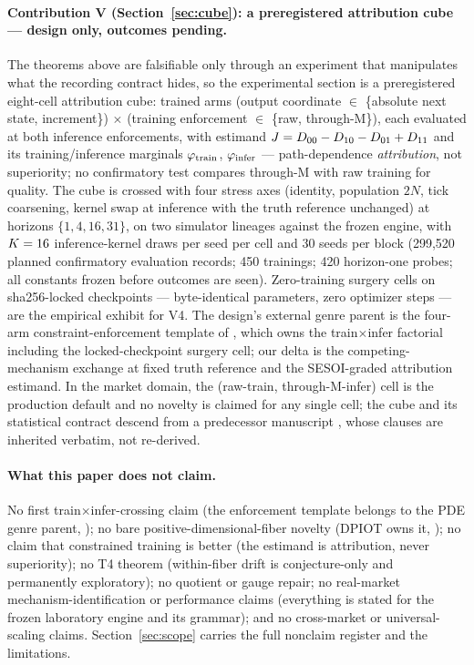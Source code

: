 \paragraph{Contribution V (Section~\ref{sec:cube}): a preregistered
attribution cube --- design only, outcomes pending.}
The theorems above are falsifiable only through an experiment that
manipulates what the recording contract hides, so the experimental section
is a preregistered eight-cell attribution cube: trained arms (output
coordinate $\in$ \{absolute next state, increment\}) $\times$ (training
enforcement $\in$ \{raw, through-M\}), each evaluated at both inference
enforcements, with estimand
$J = D_{00} - D_{10} - D_{01} + D_{11}$ and its
training/inference marginals $\varphi_{\mathrm{train}}$, $\varphi_{\mathrm{infer}}$ --- path-dependence
\emph{attribution}, not superiority; no confirmatory test compares through-M
with raw training for quality. The cube is crossed with four stress axes
(identity, population $2N$, tick coarsening, kernel swap at inference with
the truth reference unchanged) at horizons $\{1, 4, 16, 31\}$, on two
simulator lineages against the frozen engine, with $K = 16$
inference-kernel draws per seed per cell and 30 seeds per block (299{,}520
planned confirmatory evaluation records; 450 trainings; 420 horizon-one
probes; all constants frozen before outcomes are seen). Zero-training
surgery cells on sha256-locked checkpoints --- byte-identical parameters,
zero optimizer steps --- are the empirical exhibit for V4. The design's
external genre parent is the four-arm constraint-enforcement template of
\citet{duruisseaux2024}, which owns the train$\times$infer factorial
including the locked-checkpoint surgery cell; our delta is the
competing-mechanism exchange at fixed truth reference and the
SESOI-graded attribution estimand. In the market domain, the (raw-train,
through-M-infer) cell is the production default
\citep{nagy2023,mars2024,marketgpt2024,tablabm2025,tradefm2026,m3_2026} and
no novelty is claimed for any single cell; the cube and its statistical
contract descend from a predecessor manuscript \citep{paperd}, whose clauses
are inherited verbatim, not re-derived. \RESULTSPENDING

\paragraph{What this paper does not claim.}
No first train$\times$infer-crossing claim (the enforcement template belongs
to the PDE genre parent, \citealp{duruisseaux2024}); no bare
positive-dimensional-fiber novelty (DPIOT owns it, \citealp{dpiot2022}); no
claim that constrained training is better (the estimand is attribution,
never superiority); no T4 theorem (within-fiber drift is conjecture-only and
permanently exploratory); no quotient or gauge repair; no real-market
mechanism-identification or performance claims (everything is stated for the
frozen laboratory engine and its grammar); and no cross-market or
universal-scaling claims. Section~\ref{sec:scope} carries the full nonclaim
register and the limitations.

